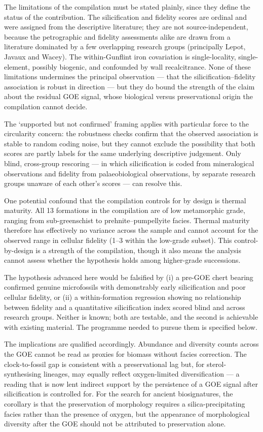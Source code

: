 \documentclass[11pt]{article}
\begin{document}
The limitations of the compilation must be stated plainly, since they define the status of the
contribution. The silicification and fidelity scores are ordinal and were assigned from the
descriptive literature; they are not source-independent, because the petrographic and fidelity
assessments alike are drawn from a literature dominated by a few overlapping research groups
(principally Lepot, Javaux and Wacey). The within-Gunflint iron covariation is single-locality,
single-element, possibly biogenic, and confounded by wall recalcitrance. None of these limitations
undermines the principal observation --- that the silicification--fidelity association is robust in
direction --- but they do bound the strength of the claim about the residual GOE signal, whose
biological versus preservational origin the compilation cannot decide.

The `supported but not confirmed' framing applies with particular force to the circularity concern:
the robustness checks confirm that the observed association is stable to random coding noise, but
they cannot exclude the possibility that both scores are partly labels for the same underlying
descriptive judgement. Only blind, cross-group rescoring --- in which silicification is coded from
mineralogical observations and fidelity from palaeobiological observations, by separate research
groups unaware of each other's scores --- can resolve this.

One potential confound that the compilation controls for by design is thermal maturity. All 13
formations in the compilation are of low metamorphic grade, ranging from sub-greenschist to
prehnite--pumpellyite facies. Thermal maturity therefore has effectively no variance across the
sample and cannot account for the observed range in cellular fidelity (1--3 within the low-grade
subset). This control-by-design is a strength of the compilation, though it also means the analysis
cannot assess whether the hypothesis holds among higher-grade successions.

The hypothesis advanced here would be falsified by (i) a pre-GOE chert bearing confirmed genuine
microfossils with demonstrably early silicification and poor cellular fidelity, or (ii) a
within-formation regression showing no relationship between fidelity and a quantitative
silicification index scored blind and across research groups. Neither is known; both are testable,
and the second is achievable with existing material. The programme needed to pursue them is
specified below.

The implications are qualified accordingly. Abundance and diversity counts across the GOE cannot be
read as proxies for biomass without facies correction. The clock-to-fossil gap is consistent with a
preservational lag but, for sterol-synthesising lineages, may equally reflect oxygen-limited
diversification --- a reading that is now lent indirect support by the persistence of a GOE signal
after silicification is controlled for. For the search for ancient biosignatures, the corollary is
that the preservation of morphology requires a silica-precipitating facies rather than the presence
of oxygen, but the appearance of morphological diversity after the GOE should not be attributed to
preservation alone.
\end{document}
